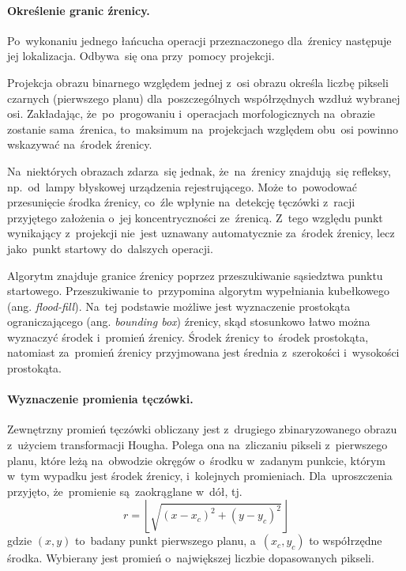 \documentclass[11pt,a4paper]{article}
\begin{document}
\paragraph{Określenie granic źrenicy.}

Po~wykonaniu jednego łańcucha operacji przeznaczonego dla~źrenicy następuje jej lokalizacja.
Odbywa~się ona przy~pomocy projekcji.

Projekcja obrazu binarnego względem jednej z~osi obrazu określa liczbę pikseli czarnych (pierwszego planu) dla~poszczególnych współrzędnych wzdłuż wybranej osi.
Zakładając, że~po~progowaniu i~operacjach morfologicznych na~obrazie zostanie sama~źrenica, to~maksimum na~projekcjach względem obu~osi powinno wskazywać na~środek źrenicy.

Na~niektórych obrazach zdarza~się jednak, że~na~źrenicy znajdują~się refleksy, np.~od~lampy błyskowej urządzenia rejestrującego.
Może to~powodować przesunięcie środka źrenicy, co~źle wpłynie na~detekcję tęczówki z~racji przyjętego założenia o~jej koncentryczności ze~źrenicą.
Z~tego względu punkt wynikający z~projekcji nie~jest uznawany automatycznie za~środek źrenicy, lecz jako~punkt startowy do~dalszych operacji.

Algorytm znajduje granice źrenicy poprzez przeszukiwanie sąsiedztwa punktu startowego.
Przeszukiwanie to~przypomina algorytm wypełniania kubełkowego (ang. \emph{flood-fill}).
Na~tej podstawie możliwe jest wyznaczenie prostokąta ograniczającego (ang. \emph{bounding box}) źrenicy, skąd stosunkowo łatwo można wyznaczyć środek i~promień źrenicy.
Środek źrenicy to~środek prostokąta, natomiast za~promień źrenicy przyjmowana jest średnia z~szerokości i~wysokości prostokąta.

\paragraph{Wyznaczenie promienia tęczówki.}
Zewnętrzny promień tęczówki obliczany jest z~drugiego zbinaryzowanego obrazu z~użyciem transformacji Hougha.
Polega ona na~zliczaniu pikseli z~pierwszego planu, które leżą na~obwodzie okręgów o~środku w~zadanym punkcie, którym w~tym wypadku jest środek źrenicy, i~kolejnych promieniach.
Dla~uproszczenia przyjęto, że~promienie są~zaokrąglane w~dół, tj.
$$ r = \left\lfloor \sqrt{(x - x_c)^2 + (y - y_c)^2} \right\rfloor $$
gdzie $(x, y)$ to~badany punkt pierwszego planu, a~$(x_c, y_c)$ to współrzędne środka.
Wybierany jest promień o~największej liczbie dopasowanych pikseli.
\end{document}
